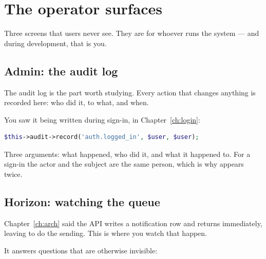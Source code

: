 \chapter{The operator surfaces}
\label{ch:operator}

Three screens that users never see. They are for whoever runs the system --- and
during development, that is you.

\section{Admin: the audit log}


The audit log is the part worth studying. Every action that changes anything is
recorded here: who did it, to what, and when.


You saw it being written during sign-in, in Chapter~\ref{ch:login}:

\begin{lstlisting}[language=PHP]
$this->audit->record('auth.logged_in', $user, $user);
\end{lstlisting}

Three arguments: what happened, who did it, and what it happened to. For a
sign-in the actor and the subject are the same person, which is why 
appears twice.

\section{Horizon: watching the queue}


Chapter~\ref{ch:arch} said the API writes a notification row and returns
immediately, leaving  to do the sending. This is where you watch
that happen.

It answers questions that are otherwise invisible:

